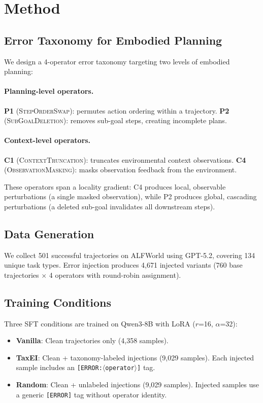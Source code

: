 \documentclass[11pt]{article}
\begin{document}
\section{Method}
\label{sec:method}

\subsection{Error Taxonomy for Embodied Planning}

We design a 4-operator error taxonomy targeting two levels of embodied planning:

\paragraph{Planning-level operators.}
\textbf{P1} (\textsc{StepOrderSwap}): permutes action ordering within a trajectory.
\textbf{P2} (\textsc{SubGoalDeletion}): removes sub-goal steps, creating incomplete plans.

\paragraph{Context-level operators.}
\textbf{C1} (\textsc{ContextTruncation}): truncates environmental context observations.
\textbf{C4} (\textsc{ObservationMasking}): masks observation feedback from the environment.

These operators span a locality gradient: C4 produces local, observable perturbations (a single masked observation), while P2 produces global, cascading perturbations (a deleted sub-goal invalidates all downstream steps).

\subsection{Data Generation}

We collect 501 successful trajectories on ALFWorld using GPT-5.2, covering 134 unique task types.
Error injection produces 4,671 injected variants (760 base trajectories $\times$ 4 operators with round-robin assignment).

\subsection{Training Conditions}

Three SFT conditions are trained on Qwen3-8B with LoRA ($r$=16, $\alpha$=32):
\begin{itemize}
\item \textbf{Vanilla}: Clean trajectories only (4,358 samples).
\item \textbf{TaxEI}: Clean + taxonomy-labeled injections (9,029 samples). Each injected sample includes an \texttt{[ERROR:$\langle$operator$\rangle$]} tag.
\item \textbf{Random}: Clean + unlabeled injections (9,029 samples). Injected samples use a generic \texttt{[ERROR]} tag without operator identity.
\end{itemize}
\end{document}
